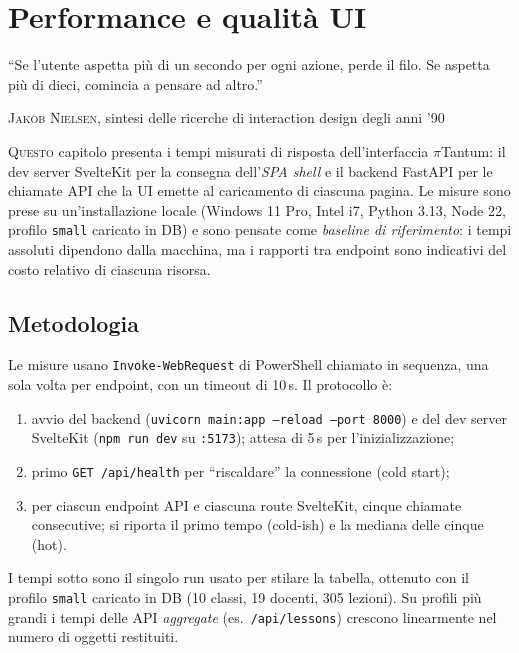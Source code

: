 \chapter{Performance e qualit\`a UI}
\label{ch:qualita_ui}

\epigraph{``Se l'utente aspetta pi\`u di un secondo per ogni
azione, perde il filo. Se aspetta pi\`u di dieci, comincia a
pensare ad altro.''}{\textsc{Jakob Nielsen}, sintesi delle
ricerche di interaction design degli anni '90}

\lettrine[lines=3]{Q}{uesto} capitolo presenta i tempi
misurati di risposta dell'interfaccia $\pi$Tantum: il dev
server SvelteKit per la consegna dell'\emph{SPA shell} e
il backend FastAPI per le chiamate API che la UI emette al
caricamento di ciascuna pagina. Le misure sono prese su
un'installazione locale (Windows 11 Pro, Intel i7,
Python 3.13, Node 22, profilo \texttt{small} caricato in
DB) e sono pensate come \emph{baseline di riferimento}: i
tempi assoluti dipendono dalla macchina, ma i rapporti tra
endpoint sono indicativi del costo relativo di ciascuna
risorsa.

\section{Metodologia}

Le misure usano \texttt{Invoke-WebRequest} di PowerShell
chiamato in sequenza, una sola volta per endpoint, con un
timeout di 10\,s. Il protocollo \`e:

\begin{enumerate}
\item avvio del backend (\texttt{uvicorn main:app --reload
  --port 8000}) e del dev server SvelteKit
  (\texttt{npm run dev} su \texttt{:5173}); attesa di 5\,s per
  l'inizializzazione;
\item primo \texttt{GET /api/health} per ``riscaldare'' la
  connessione (cold start);
\item per ciascun endpoint API e ciascuna route SvelteKit,
  cinque chiamate consecutive; si riporta il primo tempo
  (cold-ish) e la mediana delle cinque (hot).
\end{enumerate}

I tempi sotto sono il singolo run usato per stilare la
tabella, ottenuto con il profilo \texttt{small} caricato in
DB (10 classi, 19 docenti, 305 lezioni). Su profili pi\`u
grandi i tempi delle API \emph{aggregate} (es.\
\texttt{/api/lessons}) crescono linearmente nel numero di
oggetti restituiti.

